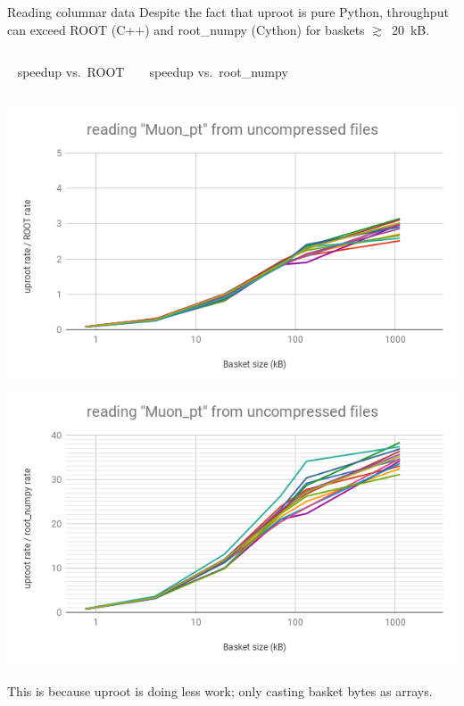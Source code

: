 \documentclass[aspectratio=169]{beamer}
\begin{document}
\begin{frame}{Reading columnar data}
\vspace{0.5 cm}
Despite the fact that uproot is pure Python, throughput can exceed ROOT (C++) and root\_numpy (Cython) for baskets $\gtrsim$~20~kB.

\vspace{0.5 cm}
\begin{columns}
\small
\mbox{ } \hfill \hfill speedup vs.\ ROOT \hfill \mbox{ }
\small
\mbox{ } \hfill speedup vs.\ root\_numpy \hfill \hfill \mbox{ }
\end{columns}

\includegraphics[width=0.5\linewidth]{root-none-muon.png}\includegraphics[width=0.5\linewidth]{rootnumpy-none-muon.png}

\vspace{0.25 cm}
This is because uproot is doing less work; only casting basket bytes as arrays.
\end{frame}
\end{document}

